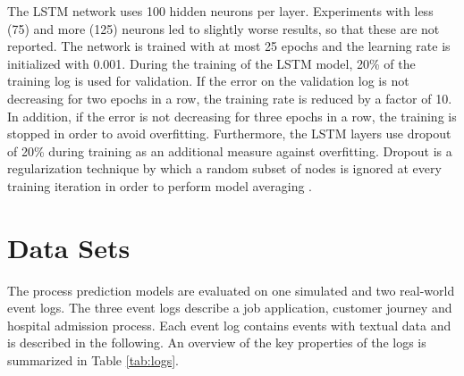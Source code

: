 The LSTM network uses 100 hidden neurons per layer.
Experiments with less (75) and more (125) neurons led to slightly worse results, so that these are not reported.
The network is trained with at most 25 epochs and the learning rate is initialized with 0.001.
During the training of the LSTM model, 20\% of the training log is used for validation.
If the error on the validation log is not decreasing for two epochs in a row, the training rate is reduced by a factor of 10.
In addition, if the error is not decreasing for three epochs in a row, the training is stopped in order to avoid overfitting.
Furthermore, the LSTM layers use dropout of 20\% during training as an additional measure against overfitting.
Dropout is a regularization technique by which a random subset of nodes is ignored at every training iteration in order to perform model averaging \cite{DBLP:journals/corr/abs-1207-0580}.


\section{Data Sets}

The process prediction models are evaluated on one simulated and two real-world event logs.
The three event logs describe a job application, customer journey and hospital admission process.
Each event log contains events with textual data and is described in the following.
An overview of the key properties of the logs is summarized in Table \ref{tab:logs}.

